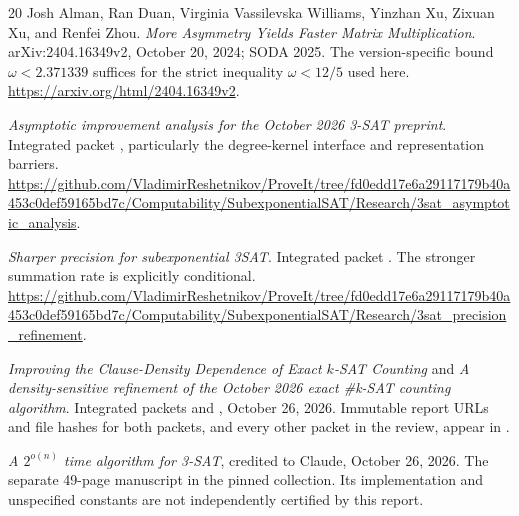 \begin{thebibliography}{20}
Josh Alman, Ran Duan, Virginia Vassilevska Williams, Yinzhan Xu,
Zixuan Xu, and Renfei Zhou.
\emph{More Asymmetry Yields Faster Matrix Multiplication}.
arXiv:2404.16349v2, October 20, 2024; SODA 2025.
The version-specific bound $\omega<2.371339$ suffices for the strict
inequality $\omega<12/5$ used here.
\url{https://arxiv.org/html/2404.16349v2}.

\emph{Asymptotic improvement analysis for the October 2026 3-SAT preprint}.
Integrated packet , particularly
the degree-kernel interface and representation barriers.
\url{https://github.com/VladimirReshetnikov/ProveIt/tree/fd0edd17e6a29117179b40a453c0def59165bd7c/Computability/SubexponentialSAT/Research/3sat_asymptotic_analysis}.

\emph{Sharper precision for subexponential 3SAT}. Integrated packet
. The stronger summation rate is
explicitly conditional.
\url{https://github.com/VladimirReshetnikov/ProveIt/tree/fd0edd17e6a29117179b40a453c0def59165bd7c/Computability/SubexponentialSAT/Research/3sat_precision_refinement}.

\emph{Improving the Clause-Density Dependence of Exact $k$-SAT Counting}
and \emph{A density-sensitive refinement of the October 2026 exact
\#k-SAT counting algorithm}.
Integrated packets  and
, October 26, 2026.
Immutable report URLs and file hashes for both packets, and every other
packet in the review, appear in .

\emph{A $2^{o(n)}$ time algorithm for 3-SAT}, credited to Claude,
October 26, 2026. The separate 49-page manuscript
 in the pinned collection.
Its implementation and unspecified constants are not independently
certified by this report.
\end{thebibliography}
